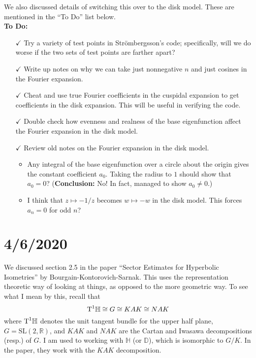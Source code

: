 \documentclass[]{article}
\begin{document}
\noindent We also discussed details of switching this over to the disk model.
These are mentioned in the ``To Do'' list below.
\\

\noindent \textbf{To Do:}
\begin{itemize}
	\item[$\checkmark$] Try a variety of test points in Str\"ombergsson's code; specifically, will we do worse if the two sets of test points are farther apart?
	\item[$\checkmark$] Write up notes on why we can take just nonnegative $n$ and just cosines in the Fourier expansion.
	\item[$\checkmark$] Cheat and use true Fourier coefficients in the cuspidal expansion to get coefficients in the disk expansion.
	This will be useful in verifying the code.
	\item[$\checkmark$] Double check how evenness and realness of the base eigenfunction affect the Fourier expansion in the disk model.
	\item[$\checkmark$] Review old notes on the Fourier expansion in the disk model.
	\begin{itemize}
		\item Any integral of the base eigenfunction over a circle about the origin gives the constant coefficient $a_0$.
		Taking the radius to $1$ should show that $a_0 = 0$? (\textbf{Conclusion:} No! In fact, managed to show $a_0 \neq 0$.)
		\item I think that $z \mapsto -1/z$ becomes $w \mapsto -w$ in the disk model.
		This forces $a_n = 0$ for odd $n$?
	\end{itemize}
\end{itemize}
	
\section*{4/6/2020}

We discussed section 2.5 in the paper ``Sector Estimates for Hyperbolic Isometries'' by Bourgain-Kontorovich-Sarnak.
This uses the representation theoretic way of looking at things, as opposed to the more geometric way.
To see what I mean by this, recall that
$$
\textup{T}^1\mathbb{H} \cong G \cong KAK \cong NAK
$$
where $\textup{T}^1\mathbb{H}$ denotes the unit tangent bundle for the upper half plane, $G = \text{SL}(2, \mathbb{R})$, and $KAK$ and $NAK$ are the Cartan and Iwasawa decompositions (resp.) of $G$.
I am used to working with $\mathbb{H}$ (or $\mathbb{D}$), which is isomorphic to $G/K$.
In the paper, they work with the $KAK$ decomposition.
\end{document}
